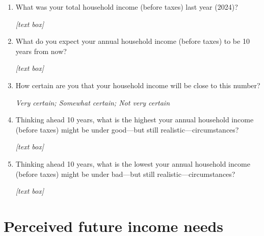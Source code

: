 \documentclass[11pt, headsepline]{article}
\begin{document}
\begin{enumerate}[resume]
    [The following questions in this section appear according to the responses at the beginning.]

    \item What was your total household income (before taxes) last year (2024)?

    \textit{[text box]}

    \item What do you expect your annual household income (before taxes) to be 10 years from now? 

    \textit{[text box]}

    \item How certain are you that your household income will be close to this number?

    \textit{Very certain; Somewhat certain; Not very certain}

    \item Thinking ahead 10 years, what is the highest your annual household income (before taxes) might be under good—but still realistic—circumstances?

    \textit{[text box]}

    \item Thinking ahead 10 years, what is the lowest your annual household income (before taxes) might be under bad—but still realistic—circumstances?

    \textit{[text box]}
    
\end{enumerate}

\section*{Perceived future income needs}
\end{document}
